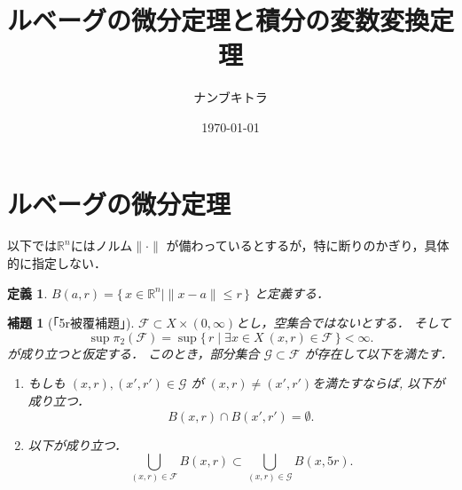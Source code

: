 \documentclass[leqno, a4paper, 12pt]{jsarticle}
\title{ルベーグの微分定理と積分の変数変換定理}
\author{ナンブキトラ}
\date{\today}
\newtheorem{lem}[thm]{補題}
\newtheorem{df}[thm]{定義}
\newcommand{\rr}{\mathbb{R}}
\begin{document}
\maketitle

\section{ルベーグの微分定理}
以下では$\rr^{n}$にはノルム$\lVert\cdot\rVert$
が備わっているとするが，特に断りのかぎり，具体的に指定しない．
\begin{df}
$B(a, r)=\{\, x\in \rr^{n}\mid \|x-a\|\le r\, \}$
と定義する．
\end{df}
\begin{lem}[「5r被覆補題」]\label{lem:5r}
 $\mathcal{F}\subset X\times (0, \infty)$とし，空集合ではないとする．
そして
\[
\sup \pi_{2}(\mathcal{F})=\sup\{\,r\mid \exists x\in X\ (x, r)\in \mathcal{F} \, \}<\infty. 
\] 
が成り立つと仮定する．
このとき，部分集合 $\mathcal{G}\subset \mathcal{F}$ が存在して以下を満たす．
\begin{enumerate}
\item 
もしも $(x, r), (x', r')\in \mathcal{G}$ が
$(x, r)\neq (x', r')$を満たすならば, 以下が成り立つ．
\[
B(x, r)\cap B(x', r')=\emptyset. 
\]
\item 
以下が成り立つ．
\[
\bigcup_{(x, r)\in \mathcal{F}}B(x, r)\subset \bigcup_{(x, r)\in \mathcal{G}}B(x, 5r). 
\]

\end{enumerate}
\end{lem}
\end{document}
